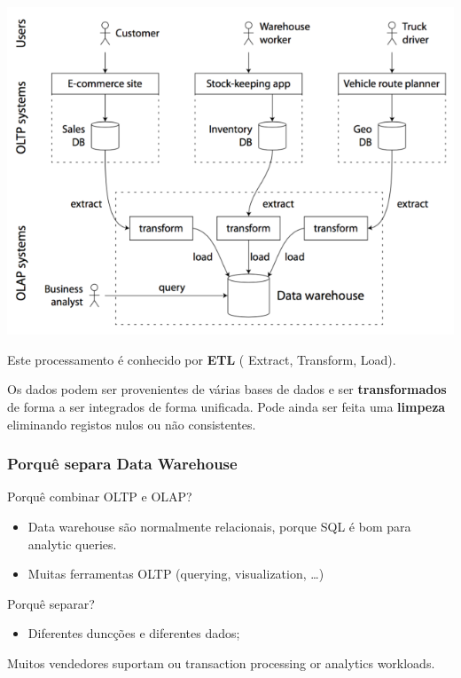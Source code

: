 \documentclass{article}
\begin{document}
\begin{center}
  \includegraphics[scale=0.3]{49}
\end{center}

Este processamento é conhecido por \textbf{ETL} (
Extract, Transform, Load).

\vspace{2mm}

Os dados podem ser provenientes de várias bases de dados e ser \textbf{transformados} de forma a ser integrados de forma
unificada. Pode ainda ser feita uma \textbf{limpeza} eliminando registos nulos ou não consistentes.

\subsubsection{Porquê separa Data Warehouse}

\begin{flushleft}
  Porquê combinar OLTP e OLAP?
  \begin{itemize}
    \item Data warehouse são normalmente relacionais, porque SQL é bom para analytic queries.
    \item Muitas ferramentas OLTP (querying, visualization, \dots)
  \end{itemize}

  Porquê separar?
  \begin{itemize}
    \item Diferentes duncções e diferentes dados;
  \end{itemize}

  Muitos vendedores suportam ou transaction
  processing or analytics workloads.
\end{flushleft}
\end{document}
